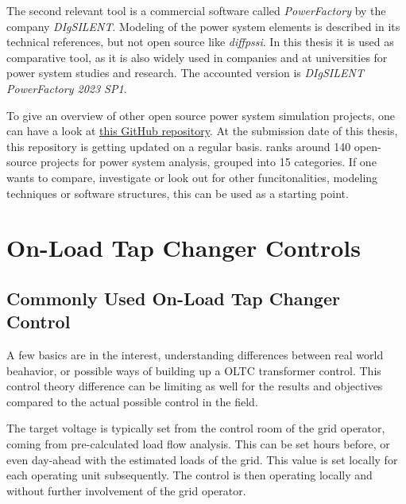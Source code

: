 The second relevant tool is a commercial software called \textit{PowerFactory} by the company \textit{DIgSILENT}.
Modeling of the power system elements is described in its technical references, but not open source like \textit{diffpssi}.
In this thesis it is used as comparative tool, as it is also widely used in companies and at universities for power system studies and research.
The accounted version is \textit{DIgSILENT PowerFactory 2023 SP1}.

To give an overview of other open source power system simulation projects, one can have a look at \href{https://github.com/ps-wiki/best-of-ps}{this GitHub repository}.
At the submission date of this thesis, this repository is getting updated on a regular basis.
\textcite{jinningwang_2025} ranks around 140 open-source projects for power system analysis, grouped into 15 categories.
If one wants to compare, investigate or look out for other funcitonalities, modeling techniques or software structures, this can be used as a starting point.
        
\section{On-Load Tap Changer Controls}

\subsection{Commonly Used On-Load Tap Changer Control}

A few basics are in the interest, understanding differences between real world beahavior, or possible ways of building up a \acs{OLTC} transformer control. 
This control theory difference can be limiting as well for the results and objectives compared to the actual possible control in the field.

The target voltage is typically set from the control room of the grid operator, coming from pre-calculated load flow analysis. 
This can be set hours before, or even day-ahead with the estimated loads of the grid. 
This value is set locally for each operating unit subsequently. 
The control is then operating locally and without further involvement of the grid operator. \quelle

